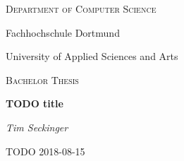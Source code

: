{\centering
  {\small\scshape Department of Computer Science \par}
  {\large Fachhochschule Dortmund \par}
  {\large University of Applied Sciences and Arts \par}
  \vspace{1cm}
  {\large\scshape Bachelor Thesis \par}
  \vspace{3cm}

  {\huge\bfseries TODO title \par}
  \vspace{2cm}
  {\large\itshape Tim Seckinger \par}
  \vfill

  {\large TODO 2018-08-15}
}
